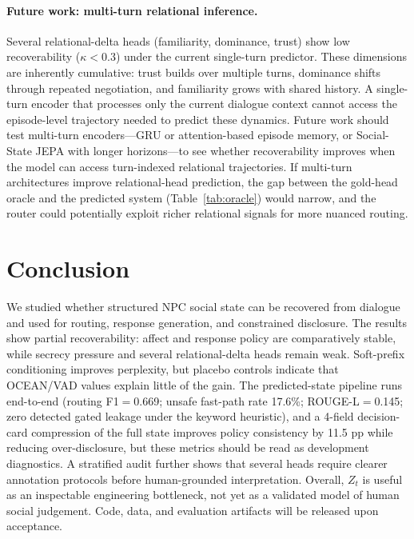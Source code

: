 \documentclass[11pt]{article}
\begin{document}
\paragraph{Future work: multi-turn relational inference.}
Several relational-delta heads (familiarity, dominance, trust) show low recoverability ($\kappa{<}0.3$) under the current single-turn predictor. These dimensions are inherently cumulative: trust builds over multiple turns, dominance shifts through repeated negotiation, and familiarity grows with shared history. A single-turn encoder that processes only the current dialogue context cannot access the episode-level trajectory needed to predict these dynamics. Future work should test multi-turn encoders---GRU or attention-based episode memory, or Social-State JEPA with longer horizons---to see whether recoverability improves when the model can access turn-indexed relational trajectories. If multi-turn architectures improve relational-head prediction, the gap between the gold-head oracle and the predicted system (Table~\ref{tab:oracle}) would narrow, and the router could potentially exploit richer relational signals for more nuanced routing.

\section{Conclusion}
\label{sec:conclusion}

We studied whether structured NPC social state can be recovered from dialogue and used for routing, response generation, and constrained disclosure.
The results show partial recoverability: affect and response policy are comparatively stable, while secrecy pressure and several relational-delta heads remain weak.
Soft-prefix conditioning improves perplexity, but placebo controls indicate that OCEAN/VAD values explain little of the gain.
The predicted-state pipeline runs end-to-end (routing F1$=$0.669; unsafe fast-path rate 17.6\%; ROUGE-L$=$0.145; zero detected gated leakage under the keyword heuristic), and a 4-field decision-card compression of the full state improves policy consistency by 11.5 pp while reducing over-disclosure, but these metrics should be read as development diagnostics.
A stratified audit further shows that several heads require clearer annotation protocols before human-grounded interpretation.
Overall, $Z_t$ is useful as an inspectable engineering bottleneck, not yet as a validated model of human social judgement.
Code, data, and evaluation artifacts will be released upon acceptance.
\end{document}
